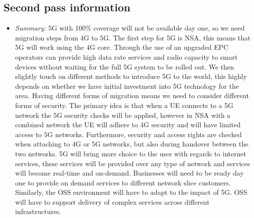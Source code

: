 \documentclass[letterpaper,twocolumn,10pt]{article}
\begin{document}
\subsection{Second pass information}
\label{sec:second}

\begin{itemize}

\item {\it Summary:} 
5G with 100\% coverage will not be available day one, so we need migration steps from 4G to 5G. The first step
for 5G is NSA, this means that 5G will work using the 4G core. Through the use of an upgraded EPC operators
can provide high data rate services and radio capacity to smart devices without waiting for the full 5G system to be 
rolled out. We then slightly touch on different methods to introduce 5G to the world, this highly depends on whether we have
initial investment into 5G technology for the area. Having different forms of migration means we need to consider different
forms of security. The primary idea is that when a UE connects to a 5G network the 5G security checks will be applied,
however in NSA with a combined network the UE will adhere to 4G security and will have limited access to 5G networks. Furthermore, 
security and access rights are checked when attaching to 4G or 5G networks, but also during handover between the two
networks. 5G will bring more choice to the user with regards to internet services, these services will be provided over any
type of network and services will become real-time and on-demand. Businesses will need to be ready day one to provide on 
demand services to different network slice customers. Similarly, the OSS environment will have to adapt to the impact of 5G. 
OSS will have to support delivery of complex services across different infrastructures. 

\end{itemize}
\end{document}
